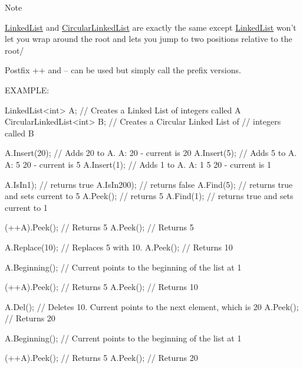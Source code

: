 \begin{DoxyNote}{Note}

\begin{DoxyEnumerate}
\item \hyperlink{class_data_structures_1_1_linked_list}{Linked\-List} and \hyperlink{class_data_structures_1_1_circular_linked_list}{Circular\-Linked\-List} are exactly the same except \hyperlink{class_data_structures_1_1_linked_list}{Linked\-List} won't let you wrap around the root and lets you jump to two positions relative to the root/
\item Postfix ++ and -- can be used but simply call the prefix versions.
\end{DoxyEnumerate}
\end{DoxyNote}
E\-X\-A\-M\-P\-L\-E\-: 
\begin{DoxyCode}
LinkedList<int> A;  \textcolor{comment}{// Creates a Linked List of integers called A}
CircularLinkedList<int> B;  \textcolor{comment}{// Creates a Circular Linked List of }
         \textcolor{comment}{// integers called B}

A.Insert(20);  \textcolor{comment}{// Adds 20 to A.  A: 20 - current is 20}
A.Insert(5);  \textcolor{comment}{// Adds 5 to A.  A: 5 20 - current is 5}
A.Insert(1);  \textcolor{comment}{// Adds 1 to A.  A: 1 5 20 - current is 1}

A.IsIn1); \textcolor{comment}{// returns true}
A.IsIn200); \textcolor{comment}{// returns false}
A.Find(5);  \textcolor{comment}{// returns true and sets current to 5}
A.Peek();  \textcolor{comment}{// returns 5}
A.Find(1);  \textcolor{comment}{// returns true and sets current to 1}

(++A).Peek();  \textcolor{comment}{// Returns 5}
A.Peek(); \textcolor{comment}{// Returns 5}

A.Replace(10);  \textcolor{comment}{// Replaces 5 with 10.}
A.Peek();  \textcolor{comment}{// Returns 10}

A.Beginning();  \textcolor{comment}{// Current points to the beginning of the list at 1}

(++A).Peek();  \textcolor{comment}{// Returns 5}
A.Peek();  \textcolor{comment}{// Returns 10}

A.Del();  \textcolor{comment}{// Deletes 10.  Current points to the next element, which is 20}
A.Peek();  \textcolor{comment}{// Returns 20}

A.Beginning();  \textcolor{comment}{// Current points to the beginning of the list at 1}

(++A).Peek();  \textcolor{comment}{// Returns 5}
A.Peek();  \textcolor{comment}{// Returns 20}


\end{DoxyCode}
